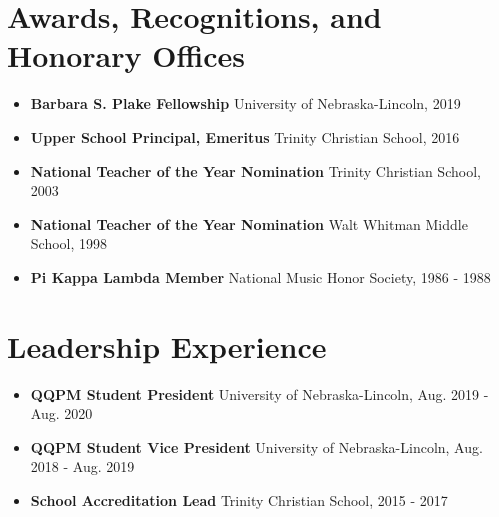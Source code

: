 \documentclass[letterpaper,11pt]{article}
\begin{document}
\section{Awards, Recognitions, and Honorary Offices}
 \begin{itemize}[leftmargin=0.15in, label={}]
\item\textbf{Barbara S. Plake Fellowship} University of Nebraska-Lincoln, 2019\\
\item\textbf{Upper School Principal, Emeritus} Trinity Christian School, 2016\\
\item\textbf{National Teacher of the Year Nomination} Trinity Christian School, 2003\\
\item\textbf{National Teacher of the Year Nomination} Walt Whitman Middle School, 1998\\
\item\textbf{Pi Kappa Lambda Member} National Music Honor Society, 1986 - 1988 \\
  \end{itemize}

%
\section{Leadership Experience}
 \begin{itemize}[leftmargin=0.15in, label={}]
\item\textbf{QQPM Student President} University of Nebraska-Lincoln, Aug. 2019 - Aug. 2020 \\
\item\textbf{QQPM Student Vice President} University of Nebraska-Lincoln, Aug. 2018 - Aug. 2019 \\
\item\textbf{School Accreditation Lead} Trinity Christian School, 2015 - 2017 \\
  \end{itemize}

%
\end{document}
